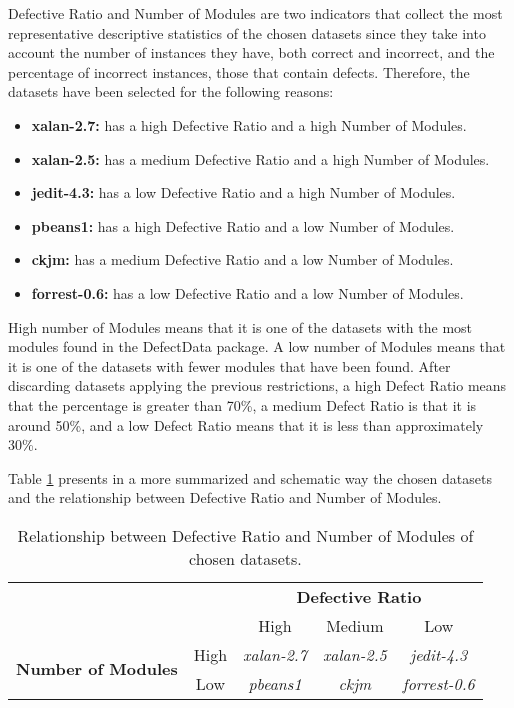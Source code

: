 Defective Ratio and Number of Modules are two indicators that collect the most representative descriptive statistics of the chosen datasets since they take into account the number of instances they have, both correct and incorrect, and the percentage of incorrect instances, those that contain defects. Therefore, the datasets have been selected for the following reasons:
\begin{itemize}
    \item \textbf{xalan-2.7:} has a high Defective Ratio and a high Number of Modules.
    \item \textbf{xalan-2.5:} has a medium Defective Ratio and a high Number of Modules.
    \item \textbf{jedit-4.3:} has a low Defective Ratio and a high Number of Modules.
    \item \textbf{pbeans1:} has a high Defective Ratio and a low Number of Modules.
    \item \textbf{ckjm:} has a medium Defective Ratio and a low Number of Modules.
    \item \textbf{forrest-0.6:} has a low Defective Ratio and a low Number of Modules.
\end{itemize}
High number of Modules means that it is one of the datasets with the most modules found in the DefectData package. A low number of Modules means that it is one of the datasets with fewer modules that have been found. After discarding datasets applying the previous restrictions, a high Defect Ratio means that the percentage is greater than 70\%, a medium Defect Ratio is that it is around 50\%, and a low Defect Ratio means that it is less than approximately 30\%.

Table \ref{tab:relationship-datasets} presents in a more summarized and schematic way the chosen datasets and the relationship between Defective Ratio and Number of Modules.

\begin{table}[H]
\centering
    \begin{tabular}{|c|c|c|c|c|}
    \cline{3-5}
    \multicolumn{2}{c|}{} & \multicolumn{3}{c|}{\textbf{Defective Ratio}} \\ \cline{3-5}
    \multicolumn{2}{c|}{} & High & Medium & Low \\ \hline
    \multirow{2}{*}{\textbf{Number of Modules}} & High & \textit{xalan-2.7} & \textit{xalan-2.5} & \textit{jedit-4.3} \\ \cline{2-5}
    & Low & \textit{pbeans1} & \textit{ckjm} & \textit{forrest-0.6} \\ \hline
    \end{tabular}
\caption{Relationship between Defective Ratio and Number of Modules of chosen datasets.}
\label{tab:relationship-datasets}
\end{table}


